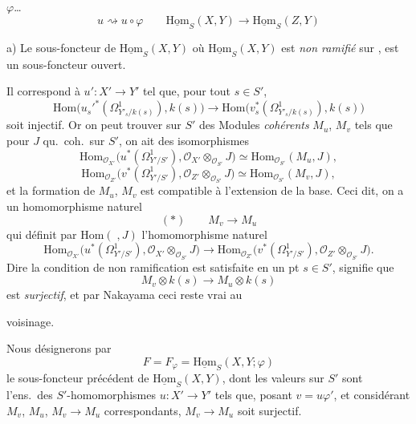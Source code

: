 \documentclass[11pt,a4paper]{article}
\begin{document}
 $\varphi$\ldots
\[
u \rightsquigarrow u\circ\varphi\qquad \underline{\mathrm{Hom}}_S(X,Y)\longrightarrow\underline{\mathrm{Hom}}_S(Z,Y)
\]

a) Le sous-foncteur de $\underline{\mathrm{Hom}}_S(X,Y)$ où $\underline{\mathrm{Hom}}_S(X,Y)$ est \emph{non ramifié} sur , est un sous-foncteur ouvert.

Il correspond à $u'\colon X'\to Y'$ tel que, pour tout $s\in S'$,
\[
\mathrm{Hom}\bigl(u_s'^{*}(\Omega^1_{Y'_s/k(s)}),k(s)\bigr)\longrightarrow\mathrm{Hom}\bigl(v_s^{*}(\Omega^1_{Y'_s/k(s)}),k(s)\bigr)
\]
soit injectif. Or on peut trouver sur $S'$ des Modules \emph{cohérents} $M_u$, $M_v$ tels que pour  $J$ qu.\ coh.\ sur $S'$, on ait des isomorphismes
\[
\mathrm{Hom}_{\mathcal{O}_{X'}}\bigl(u^*(\Omega^1_{Y'/S'}),\mathcal{O}_{X'}\otimes_{\mathcal{O}_{S'}}J\bigr)\simeq\mathrm{Hom}_{\mathcal{O}_{S'}}(M_u,J),
\]
\[
\mathrm{Hom}_{\mathcal{O}_{Z'}}\bigl(v^*(\Omega^1_{Y'/S'}),\mathcal{O}_{Z'}\otimes_{\mathcal{O}_{S'}}J\bigr)\simeq\mathrm{Hom}_{\mathcal{O}_{S'}}(M_v,J),
\]
et la formation de $M_u$, $M_v$ est compatible \ill{} à l'extension de la base. Ceci dit, on a un homomorphisme naturel
\[
(*)\qquad M_v\longrightarrow M_u
\]
qui définit par $\mathrm{Hom}(\;,J)$ l'homomorphisme naturel
\[
\mathrm{Hom}_{\mathcal{O}_{X'}}\bigl(u^*(\Omega^1_{Y'/S'}),\mathcal{O}_{X'}\otimes_{\mathcal{O}_{S'}}J\bigr)\longrightarrow\mathrm{Hom}_{\mathcal{O}_{Z'}}\bigl(v^*(\Omega^1_{Y'/S'}),\mathcal{O}_{Z'}\otimes_{\mathcal{O}_{S'}}J\bigr).
\]
Dire \struck{\ill{}}  la condition de non ramification est satisfaite en un pt $s\in S'$, signifie que
\[
M_v\otimes k(s)\longrightarrow M_u\otimes k(s)
\]
est \emph{surjectif}, et par Nakayama ceci reste vrai au



voisinage.

Nous désignerons par
\[
F=F_\varphi=\underline{\mathrm{Hom}}_S(X,Y;\varphi)
\]
le sous-foncteur précédent de $\underline{\mathrm{Hom}}_S(X,Y)$, dont les valeurs sur $S'$ sont l'ens.\ des $S'$-homomorphismes $u\colon X'\to Y'$ tels que, posant $v=u\varphi'$, et considérant $M_v$, $M_u$, $M_v\to M_u$ correspondants, $M_v\to M_u$ soit surjectif.
\end{document}
